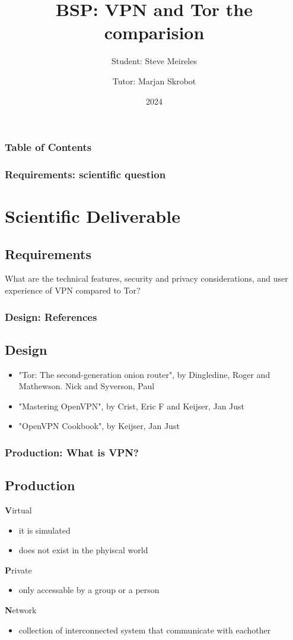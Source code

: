 \documentclass[9pt]{beamer}
\title[VPN and TOR]{BSP: VPN and Tor the comparision}
\author[Steve Meireles]{Student: Steve Meireles \and Tutor: Marjan Skrobot}
\date{2024}
\begin{document}
\frame{\titlepage}

\begin{frame}
\frametitle{Table of Contents}
\tableofcontents
\end{frame}

\begin{frame}
\frametitle{Requirements: scientific question}
\section{Scientific Deliverable}
\subsection{Requirements} 
What are the technical features, security and privacy considerations,
and user experience of VPN compared to Tor?
\end{frame}

\begin{frame}
\frametitle{Design: References}
\subsection{Design}
\begin{itemize}
	\item "Tor: The second-generation onion router", by Dingledine, Roger
		and Mathewson. Nick and Syverson, Paul 	
	\item "Mastering OpenVPN", by Crist, Eric F and Keijser, Jan Just
	\item "OpenVPN Cookbook", by Keijser, Jan Just
\end{itemize}
\end{frame}

\begin{frame}
\frametitle{Production: What is VPN?}
\subsection{Production}
\textbf{V}irtual 
	\begin{itemize}
	\item it is simulated
	\item does not exist in the phyiscal world
	\end{itemize}
\textbf{P}rivate 
	\begin{itemize}
	\item only accessable by a group or a person
	\end{itemize}
\textbf{N}etwork
	\begin{itemize}
	\item collection of interconnected system that communicate with eachother
	\end{itemize}
\end{frame}
\end{document}

